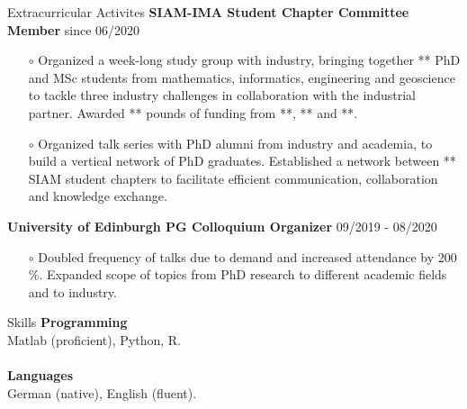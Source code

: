 \documentclass{resume} %
\begin{document}
\begin{rSection}{Extracurricular Activites}
{\bf SIAM-IMA Student Chapter Committee Member} \hfill{since 06/2020}
\begin{itemize}
	\item[$\circ$] Organized a week-long study group with industry, bringing together ** PhD and MSc students from mathematics, informatics, engineering and geoscience to tackle three industry challenges in collaboration with the industrial partner. Awarded ** pounds of funding from **, ** and **.
	\item[$\circ$] Organized talk series with PhD alumni from industry and academia, to build a vertical network of PhD graduates. Established a network between ** SIAM student chapters to facilitate efficient communication, collaboration and knowledge exchange. 
\end{itemize}
{\bf University of Edinburgh PG Colloquium Organizer} \hfill{09/2019 - 08/2020}
\begin{itemize}
	\item[$\circ$] Doubled frequency of talks due to demand and increased attendance by 200 \%. Expanded scope of topics from PhD research to different academic fields and to industry. 
\end{itemize}
\end{rSection}

\begin{rSection}{Skills}
	{\bf Programming}\\
	Matlab (proficient), Python, R.\\
	\\
	{\bf Languages}\\
	German (native), English (fluent). 
\end{rSection}
\end{document}
